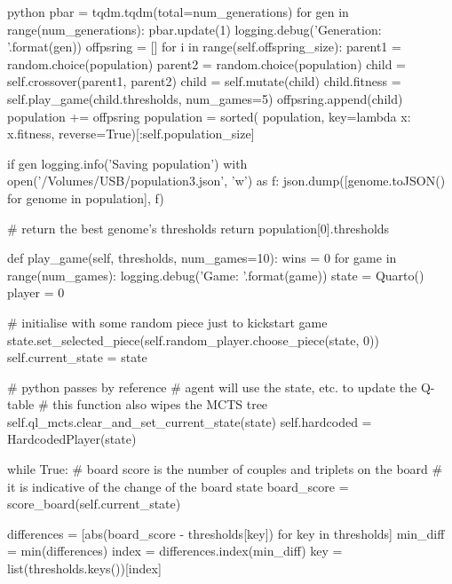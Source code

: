 \begin{mintedbox}{python}
        pbar = tqdm.tqdm(total=num_generations)
        for gen in range(num_generations):
            pbar.update(1)
            logging.debug('Generation: {}'.format(gen))
            offpsring = []
            for i in range(self.offspring_size):
                parent1 = random.choice(population)
                parent2 = random.choice(population)
                child = self.crossover(parent1, parent2)
                child = self.mutate(child)
                child.fitness = self.play_game(child.thresholds, num_games=5)
                offpsring.append(child)
            population += offpsring
            population = sorted(
                population, key=lambda x: x.fitness, reverse=True)[:self.population_size]

            if gen %
                logging.info('Saving population')
                with open('/Volumes/USB/population3.json', 'w') as f:
                    json.dump([genome.toJSON() for genome in population], f)

        # return the best genome's thresholds
        return population[0].thresholds

    def play_game(self, thresholds, num_games=10):
        wins = 0
        for game in range(num_games):
            logging.debug('Game: {}'.format(game))
            state = Quarto()
            player = 0

            # initialise with some random piece just to kickstart game
            state.set_selected_piece(self.random_player.choose_piece(state, 0))
            self.current_state = state

            # python passes by reference
            # agent will use the state, etc. to update the Q-table
            # this function also wipes the MCTS tree
            self.ql_mcts.clear_and_set_current_state(state)
            self.hardcoded = HardcodedPlayer(state)

            while True:
                # board score is the number of couples and triplets on the board
                # it is indicative of the change of the board state
                board_score = score_board(self.current_state)

                differences = [abs(board_score - thresholds[key])
                                for key in thresholds]
                min_diff = min(differences)
                index = differences.index(min_diff)
                key = list(thresholds.keys())[index]


\end{mintedbox}
